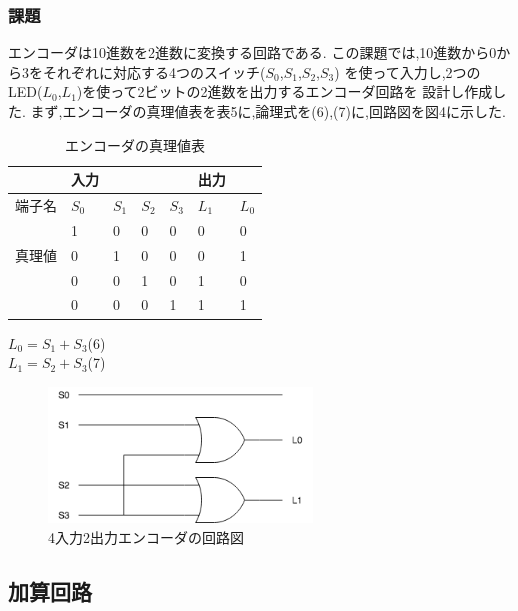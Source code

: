 \documentclass[twocolumn, 10pt,a4j]{jsarticle}
\begin{document}
  \subsubsection{課題}
  エンコーダは10進数を2進数に変換する回路である.
  この課題では,10進数から0から3をそれぞれに対応する4つのスイッチ($S_{0}$,$S_{1}$,$S_{2}$,$S_{3}$)
  を使って入力し,2つのLED($L_{0}$,$L_{1}$)を使って2ビットの2進数を出力するエンコーダ回路を
  設計し作成した.
  まず,エンコーダの真理値表を表5に,論理式を(6),(7)に,回路図を図4に示した.
  \begin{table}[H]
  \centering
  \caption{エンコーダの真理値表}
  \label{my-label}
  \footnotesize
  \begin{tabular}{l|llll|ll}
      & 入力      &         &         &         & 出力      &         \\ \hline
  端子名 & $S_{0}$ & $S_{1}$ & $S_{2}$ & $S_{3}$ & $L_{1}$ & $L_{0}$ \\ \hline
      & 1       & 0       & 0       & 0       & 0    & 0    \\
  真理値 & 0       & 1       & 0       & 0       & 0    & 1    \\
      & 0       & 0       & 1       & 0       & 1    & 0    \\
      & 0       & 0       & 0       & 1       & 1    & 1   
  \end{tabular}
  \end{table}
  \begin{center}
    $L_{0} = S_{1}+S_{3}$\quad(6) \\
    $L_{1} = S_{2}+S_{3}$\quad(7) \\
  \end{center}
  \begin{figure}[H]
    \begin{center}
      \includegraphics[width=7cm]{../img/half_adder/encoder.png}
      \caption{4入力2出力エンコーダの回路図}
    \end{center}
  \end{figure}
\subsection{加算回路}
\end{document}
